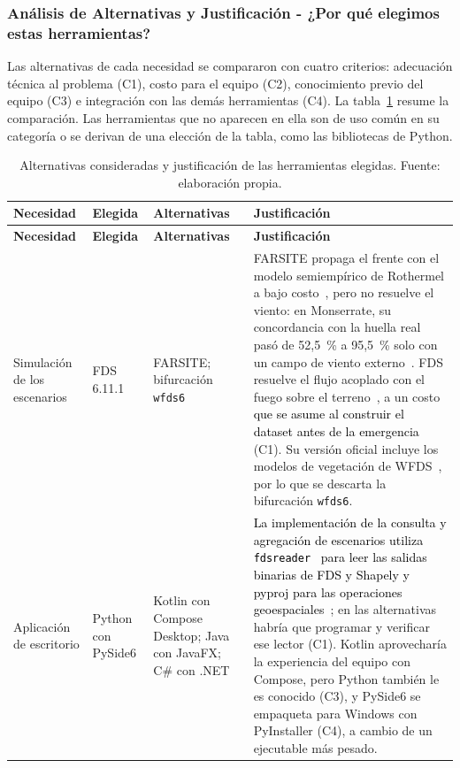 \subsubsection{Análisis de Alternativas y Justificación - ¿Por qué elegimos estas herramientas?}\label{sec:spmp-8-2-1}
Las alternativas de cada necesidad se compararon con cuatro criterios: adecuación técnica al problema (C1), costo para el equipo (C2), conocimiento previo del equipo (C3) e integración con las demás herramientas (C4). La tabla~\ref{tab:alternativas-herramientas} resume la comparación. Las herramientas que no aparecen en ella son de uso común en su categoría o se derivan de una elección de la tabla, como las bibliotecas de Python.

\begin{longtable}{|p{}|p{}|p{}|p{}|}
\caption{Alternativas consideradas y justificación de las herramientas elegidas. Fuente: elaboración propia.}\label{tab:alternativas-herramientas}\\
\hline
\textbf{Necesidad} & \textbf{Elegida} & \textbf{Alternativas} & \textbf{Justificación}\tabularnewline\hline
\endfirsthead
\hline
\textbf{Necesidad} & \textbf{Elegida} & \textbf{Alternativas} & \textbf{Justificación}\tabularnewline\hline
\endhead
\raggedright Simulación de los escenarios & \raggedright FDS 6.11.1 & \raggedright FARSITE; bifurcación \texttt{wfds6} & \raggedright FARSITE propaga el frente con el modelo semiempírico de Rothermel a bajo costo~\cite{finney1998farsite}, pero no resuelve el viento: en Monserrate, su concordancia con la huella real pasó de 52,5~\% a 95,5~\% solo con un campo de viento externo~\cite{verano2013farsite}. FDS resuelve el flujo acoplado con el fuego sobre el terreno~\cite{mell2007grassland}, a un costo \textcolor{black}{que se asume al construir el dataset antes de la emergencia} (C1). Su versión oficial incluye los modelos de vegetación de WFDS~\cite{fdsuserguide}, por lo que se descarta la bifurcación \texttt{wfds6}.\tabularnewline\hline
\raggedright Aplicación de escritorio & \raggedright Python con PySide6 & \raggedright Kotlin con Compose Desktop; Java con JavaFX; C\# con .NET & \raggedright \textcolor{black}{La implementación de la consulta y agregación de escenarios utiliza \texttt{fdsreader}}~\cite{fdsreader} \textcolor{black}{para leer las salidas binarias de FDS y Shapely y pyproj para las operaciones geoespaciales}~\cite{shapely,pyproj}; en las alternativas habría que programar y verificar ese lector (C1). Kotlin aprovecharía la experiencia del equipo con Compose, pero Python también le es conocido (C3), y PySide6 se empaqueta para Windows con PyInstaller (C4), a cambio de un ejecutable más pesado.\tabularnewline\hline

\end{longtable}
